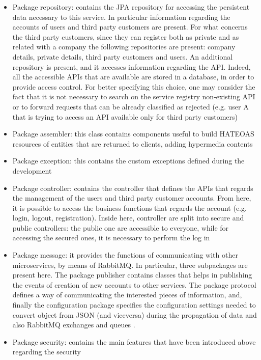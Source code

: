 \begin{itemize}
\item Package repository: contains the JPA repository for accessing the persistent data necessary to this
service. 
In particular information regarding the accounts of users and third party customers are present. For what concerns the third party customers,
since they can register both as private and as related with a company the following repositories are present: company details, private
details, third party customers and users. An additional repository is present, and it accesses information regarding the API. Indeed, all
the accessible APIs that are available are stored in a database, in order to provide access control. For better specifying this choice, 
one may consider the fact that it is not necessary to search on the service registry non-existing API or to forward requests that can
be already classified as rejected (e.g. user A that is trying to access an API available only for third party customers)
\item Package assembler: this class contains components useful to build HATEOAS resources of entities that are returned to clients, adding
hypermedia contents
\item Package exception: this contains the custom exceptions defined during the development
\item Package controller: contains the controller that defines the APIs that regards the management of the users and third party customer
accounts. From here, it is possible to access the business functions that regards the account (e.g. login, logout, registration). Inside here,
controller are split into secure and public controllers: the public one are accessible to everyone, while for accessing the secured ones,
it is necessary to perform the log in
\item Package message: it provides the functions of communicating with other microservices, by means of RabbitMQ. In particular, three
subpackages are present here. The package publisher contains classes that helps in publishing the events of creation of new accounts to other 
services. The package protocol defines a way of communicating the interested pieces of information, and, finally the configuration
package specifies the configuration settings needed to convert object from JSON (and viceversa) during the propagation of data and also RabbitMQ exchanges and queues\cite{rabbit-concepts} .
\item Package security: contains the main features that have been introduced above regarding the security 

\end{itemize}
